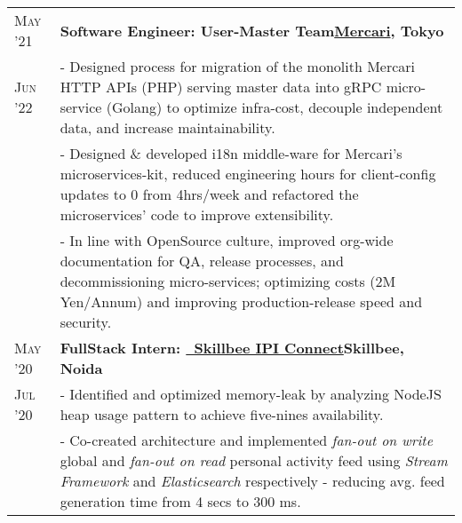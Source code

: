 \documentclass[a4paper,10pt]{extarticle} %
\begin{document}
\begin{tabularx}{\linewidth}{ l | X }


\textsc{May '21} & \textbf{Software Engineer: User-Master Team}\hfill\textbf{\href{https://mercari.com/}{Mercari}, Tokyo}\\
\textsc{Jun '22}& {- Designed process for migration of the monolith Mercari HTTP APIs (PHP) serving master data into gRPC micro-service (Golang) to optimize infra-cost, decouple independent data, and increase maintainability.}\\
& {- Designed \& developed i18n middle-ware for Mercari's microservices-kit, reduced engineering hours for client-config updates to 0 from 4hrs/week and refactored the microservices' code to improve extensibility.}\\
& {- In line with OpenSource culture, improved org-wide documentation for QA, release processes, and decommissioning micro-services; optimizing costs (2M Yen/Annum) and improving production-release speed and security. }\\[2mm]

\textsc{May '20} & \textbf{FullStack Intern: {\href{https://skillbee.com/}{\ Skillbee IPI Connect}}}\hfill\textbf{Skillbee, Noida}\\
\textsc{Jul '20}& {- Identified and optimized memory-leak by analyzing NodeJS heap usage pattern to achieve five-nines availability.}\\
& {- Co-created architecture and implemented \textit{fan-out on write} global and \textit{fan-out on read} personal activity feed using \textit{Stream Framework} and \textit{Elasticsearch} respectively - reducing avg. feed generation time from 4 secs to 300 ms.}\\[2mm]


\end{tabularx}
\end{document}
